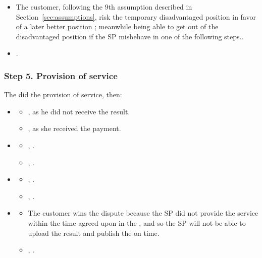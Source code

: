 \Fairness

\newcommand{\CustomerRiskTemporaryDisadvantagedPosition}[1]{The customer, following the 9th assumption described in Section~\ref{sec:assumptions}, risk the temporary disadvantaged position #1 in favor of a later better position \Pos{9}{s}{\normal}{\plus}; meanwhile being able to get out of the disadvantaged position if the SP misbehave in one of the following steps.}

\begin{itemize}
  \item \CustomerRiskTemporaryDisadvantagedPosition{\Pos{4}{c}{\normal}{\minus}}.
  \item {}.
\end{itemize}



\subsubsection*{Step 5. \SPTurn{} Provision of service}

The \sp{} did the provision of service, then:

\begin{itemize}
\item \AgreeablePath
  \begin{itemize}
    \item {},  as he did not receive the result.
    \item {},  as she received the payment.
  \end{itemize}
\item \DisputePath
  \begin{itemize}
    \item {}, \CustomerLosesBeforePoP{}.
    \item {}, .
  \end{itemize}
\end{itemize}

\ActedAbnormallyThen{\sp}

\begin{itemize}
\item \AgreeablePath
  \begin{itemize}
    \item {}, \CustomerPaidButDidntGetResult{}. 
    \item {}, \SpReceivedThePayment{}.
  \end{itemize}
\item \DisputePath
  \begin{itemize}
    \item {} The customer wins the dispute because the SP did not provide the service within the time agreed upon in the \PoD{}, and so the SP will not be able to upload the result and publish the \PoP{} on time.
    \item {}, .
  \end{itemize}
\end{itemize}

